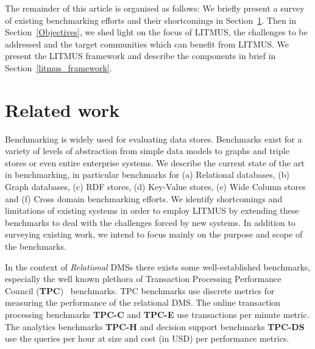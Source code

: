 \documentclass{llncs}
\begin{document}
The remainder of this article is organised as follows: 
We briefly present a survey of existing benchmarking efforts and their shortcomings in Section~\ref{relwork}. 
Then in Section~\ref{Objectives}, we shed light on the focus of LITMUS, the challenges to be addressed and the target communities which can benefit from LITMUS. 
We present the LITMUS framework and describe the components in brief in Section~\ref{litmus_framework}.  



\section{Related work}\label{relwork}

Benchmarking is widely used for evaluating data stores. 
Benchmarks exist for a variety of levels of abstraction from simple data models to graphs and triple stores or even entire enterprise systems.
We describe the current state of the art in benchmarking, in particular benchmarks for (a) Relational databases, (b) Graph databases, (c) RDF stores, (d) Key-Value stores, (e) Wide Column stores and (f) Cross domain benchmarking efforts.
We identify shortcomings and limitations of existing systems in order to employ LITMUS by extending these benchmarks to deal with the challenges forced by new systems.
In addition to surveying existing work, we intend to focus mainly on the purpose and scope of the benchmarks.
    
    In the context of \textit{Relational} DMSs there exists some well-established benchmarks, especially the well known plethora of Transaction Processing Performance Council (\textbf{TPC})~\cite{Nambiar2011} benchmarks.
    TPC benchmarks use discrete metrics for measuring the performance of the relational DMS. The online transaction processing benchmarks \textbf{TPC-C} and \textbf{TPC-E} use transactions per minute metric. The analytics benchmarks \textbf{TPC-H} and decision support benchmarks \textbf{TPC-DS} use the queries per hour at size and cost (in USD) per performance metrics.
    
\end{document}
